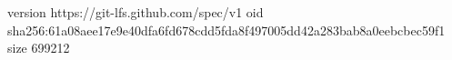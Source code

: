 version https://git-lfs.github.com/spec/v1
oid sha256:61a08aee17e9e40dfa6fd678cdd5fda8f497005dd42a283bab8a0eebcbec59f1
size 699212

